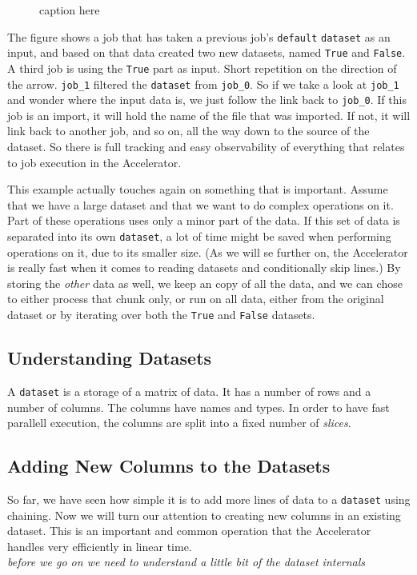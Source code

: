 \documentclass[a4paper]{article}
\begin{document}
\begin{figure}[h!]
  \begin{center}
    
    \caption{caption here}
    \label{fig:dep_dataset_csvimport_chain}
  \end{center}
\end{figure}

The figure shows a job that has taken a previous job's
\texttt{default} \texttt{dataset} as an input, and based on that data
created two new datasets, named \texttt{True} and \texttt{False}.  A
third job is using the \texttt{True} part as input.  Short repetition
on the direction of the arrow.  \texttt{job\_1} filtered the
\texttt{dataset} from \texttt{job\_0}.  So if we take a look at
\texttt{job\_1} and wonder where the input data is, we just follow the
link back to \texttt{job\_0}.  If this job is an import, it will hold
the name of the file that was imported.  If not, it will link back to
another job, and so on, all the way down to the source of the dataset.
So there is full tracking and easy observability of everything that
relates to job execution in the Accelerator.


This example actually touches again on something that is important.
Assume that we have a large dataset and that we want to do complex
operations on it.  Part of these operations uses only a minor part of
the data.  If this set of data is separated into its own
\texttt{dataset}, a lot of time might be saved when performing
operations on it, due to its smaller size.  (As we will se further on,
the Accelerator is really fast when it comes to reading datasets and
conditionally skip lines.)  By storing the \textsl{other} data as
well, we keep an copy of all the data, and we can chose to either
process that chunk only, or run on all data, either from the original
dataset or by iterating over both the \texttt{True} and \texttt{False}
datasets.



\subsection{Understanding Datasets}
A \texttt{dataset} is a storage of a matrix of data.  It has a number
of rows and a number of columns.  The columns have names and types.
In order to have fast parallell execution, the columns are split into
a fixed number of \textsl{slices}.



\subsection{Adding New Columns to the Datasets}
So far, we have seen how simple it is to add more lines of data to a
\texttt{dataset} using chaining.  Now we will turn our attention to
creating new columns in an existing dataset.  This is an important and
common operation that the Accelerator handles very efficiently in
linear time.\\
\textsl{before we go on we need to understand a little bit of the dataset internals}\\
\end{document}

